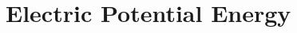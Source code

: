 \documentclass[12pt,aspectratio=169]{beamer}
\begin{document}
%    
%
%
%
%
%
%
%    
%
%
%




\section{Electric Potential Energy}
\end{document}
